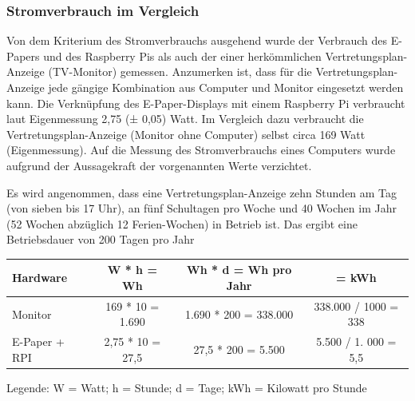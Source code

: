 \documentclass[10pt]{article}
\begin{document}
\subsubsection{Stromverbrauch im Vergleich}
Von dem Kriterium des Stromverbrauchs ausgehend wurde der Verbrauch des E-Papers und des Raspberry Pis als auch der einer herkömmlichen Vertretungsplan-Anzeige (TV-Monitor) gemessen. Anzumerken ist, dass für die Vertretungsplan-Anzeige jede gängige Kombination aus Computer und Monitor eingesetzt werden kann. Die Verknüpfung des E-Paper-Displays mit einem Raspberry Pi verbraucht laut Eigenmessung 2,75 (± 0,05) Watt. Im Vergleich dazu verbraucht die Vertretungsplan-Anzeige (Monitor ohne Computer) selbst circa 169 Watt (Eigenmessung). Auf die Messung des Stromverbrauchs eines Computers wurde aufgrund der Aussagekraft der vorgenannten Werte verzichtet.  

Es wird angenommen, dass eine Vertretungsplan-Anzeige zehn Stunden am Tag (von sieben bis 17 Uhr), an fünf Schultagen pro Woche und 40 Wochen im Jahr (52 Wochen abzüglich 12 Ferien-Wochen) in Betrieb ist. Das ergibt eine Betriebsdauer von 200 Tagen pro Jahr
\newline

\noindent
\begin{tabular}{|l|c|c|c|} \hline
    Hardware & W * h = Wh & Wh * d = Wh pro Jahr & = kWh \\ \hline
   Monitor  & 169 * 10 = 1.690 & 1.690 * 200 = 338.000 & 338.000 / 1000 = 338\\ \hline
    E-Paper + RPI & 2,75 * 10 = 27,5 & 27,5 * 200 = 5.500 & 5.500 / 1. 000 = 5,5 \\ \hline
\end{tabular} 
\newline

\noindent
Legende: W = Watt; h = Stunde; d = Tage; kWh = Kilowatt pro Stunde
\newline
\end{document}
